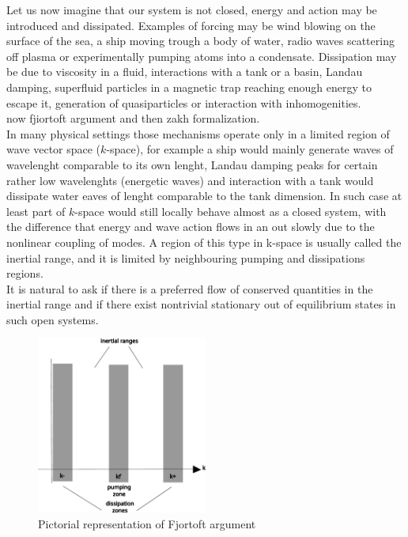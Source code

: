 Let us now imagine that our system is not closed, energy and action may be introduced and dissipated. Examples of forcing may be wind blowing on the surface of the sea, 
a ship moving trough a body of water, radio waves scattering off plasma or experimentally pumping atoms into a condensate. Dissipation may be due to viscosity in a fluid,
interactions with a tank or a basin, Landau damping, superfluid particles in a magnetic trap reaching enough energy to escape it, generation of quasiparticles or interaction 
with inhomogenities.\\
now fjiortoft argument and then zakh formalization.\\
In many physical settings those mechanisms operate only in a limited region of wave vector space ($k$-space), for example a ship would mainly generate waves of wavelenght comparable to 
its own lenght, Landau damping peaks for certain rather low wavelenghts (energetic waves) and interaction with a tank would dissipate water eaves of lenght comparable to the tank dimension. In such 
case at least part of  $k$-space would still locally behave almost as a closed system, with the difference that energy and wave action flows in an out slowly due to the nonlinear 
coupling of modes. A region of this type in k-space is usually called the inertial range, and it is limited by neighbouring pumping and dissipations regions.\\
It is natural to ask if there is a preferred flow of conserved quantities in the inertial range and if there exist nontrivial stationary out of equilibrium 
states in such open systems. \\
\begin{figure} %
    \centering
    \includegraphics[width=0.5\textwidth]{images/Fjortoft.pdf}
    \caption{Pictorial representation of Fjortoft argument}
\end{figure}

